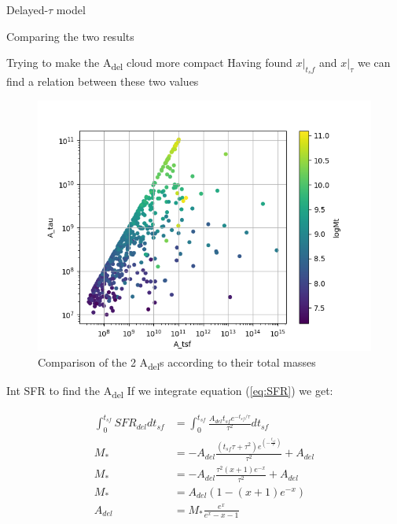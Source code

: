\documentclass[presentation]{beamer}
\begin{document}
\begin{frame}[label={sec:org05089e9}]{Delayed-\(\tau\) model}
\begin{block}{Comparing the two results}
\begin{block}{Trying to make the A\textsubscript{del} cloud more compact}
Having found \(x|_{t_sf}\) and \(x|_{\tau}\) we can find a relation between these two values


\begin{figure}[!htpb]
\centering
\includegraphics[width=.9\linewidth]{./figs/A_tau-A_tsf_Mt.png}
\caption{\label{fig:Comparison of the 2 A_{del}s according to their total masses}Comparison of the 2 A\textsubscript{del}s according to their total masses}
\end{figure}
\end{block}
\end{block}


\begin{block}{Int SFR to find the A\textsubscript{del}}
If we integrate equation (\ref{eq:SFR}) we get:


\begin{equation}\label{eq:int SFR}
\begin{align}
\int^{t_{sf}}_0 SFR_{del} dt_{sf}&=\int^{t_{sf}}_0 \frac{A_{del}t_{sf}e^{-t_{sf}/\tau}}{\tau^2} dt_{sf}\\
M_*&=-A_{del} \frac{{\left(t_{\mathit{sf}} \tau + \tau^{2}\right)} e^{\left(-\frac{t_{\mathit{sf}}}{\tau}\right)}}{\tau^{2}}+A_{del}\\
M_*&=-A_{del}\frac{\tau^2(x+1)e^{-x}}{\tau^2}+A_{del}\\
M_*& = A_{del}(1-(x+1)e^{-x})\\
A_{del}&=M_*\frac{e^x}{e^x-x-1}
\end{align}
\end{equation}



\end{block}
\end{frame}
\end{document}
